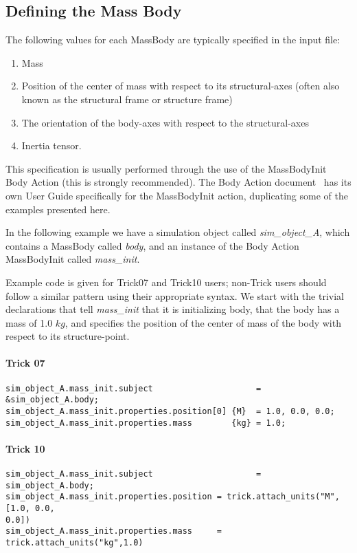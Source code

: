 \subsection{Defining the Mass Body}
The following values for each MassBody are typically specified in the input
file:
 \begin{enumerate}
   \item Mass
   \item Position of the center of mass with respect to its structural-axes
   (often also known as the structural frame or structure frame)
   \item The orientation of the body-axes with respect to the
   structural-axes
   \item Inertia tensor.
   \end{enumerate}

This specification is usually performed through the use of the MassBodyInit
Body Action (this is strongly recommended).  The Body Action
document~\cite{dynenv:BODYACTION} has its own User Guide specifically for the
MassBodyInit action, duplicating some of the examples presented here.

In the following example we have a simulation object called
\textit{sim\_object\_A}, which contains a MassBody called \textit{body}, and
an instance of the Body Action MassBodyInit called \textit{mass\_init}.

Example code is given for Trick07 and Trick10 users; non-Trick users should
follow a similar pattern using their appropriate syntax.  We start with the
trivial declarations that tell \textit{mass\_init} that it is initializing
body, that the body has a mass of 1.0 $kg$, and specifies the position of the
center of mass of the body with respect to its structure-point.

\paragraph{Trick 07}
\begin{verbatim}
sim_object_A.mass_init.subject                     = &sim_object_A.body;
sim_object_A.mass_init.properties.position[0] {M}  = 1.0, 0.0, 0.0;
sim_object_A.mass_init.properties.mass        {kg} = 1.0;
\end{verbatim}

\paragraph{Trick 10}
\begin{verbatim}
sim_object_A.mass_init.subject                     = sim_object_A.body;
sim_object_A.mass_init.properties.position = trick.attach_units("M",[1.0, 0.0,
0.0])
sim_object_A.mass_init.properties.mass     = trick.attach_units("kg",1.0)
\end{verbatim}

